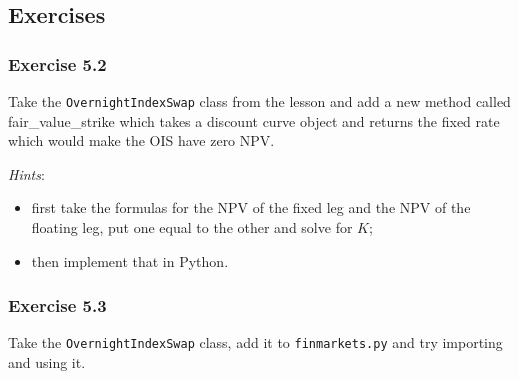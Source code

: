 \documentclass[11pt]{article}
\begin{document}
    \hypertarget{exercises}{%
\subsection{Exercises}\label{exercises}}

\hypertarget{exercise-5.2}{%
\subsubsection{Exercise 5.2}\label{exercise-5.2}}

Take the \texttt{OvernightIndexSwap} class from the lesson and add a new
method called fair\_value\_strike which takes a discount curve object
and returns the fixed rate which would make the OIS have zero NPV.

\emph{Hints}:
\begin{itemize}
\item first take the formulas for the NPV of the fixed leg and
the NPV of the floating leg, put one equal to the other and solve for
$K$;
\item then implement that in Python.
\end{itemize}

\hypertarget{exercise-5.3}{%
\subsubsection{Exercise 5.3}\label{exercise-5.3}}

Take the \texttt{OvernightIndexSwap} class, add it to
\texttt{finmarkets.py} and try importing and using it.


    
    
    
    
\end{document}
